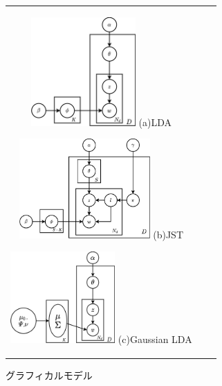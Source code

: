 \documentclass[uplatex]{jsarticle}
\begin{document}
\begin{figure}
    \begin{tabular}{ccc}
        \begin{minipage}[b]{0.33\hsize}
            \begin{center}
                \includegraphics[width=4cm]{picture/LDA.png}
                (a)LDA
            \end{center}
        \end{minipage}
        \begin{minipage}[b]{0.33\hsize}
            \begin{center}
                \includegraphics[width=5cm]{picture/JST.png}
                (b)JST
            \end{center}
        \end{minipage}
        \begin{minipage}[b]{0.33\hsize}
            \begin{center}
                \includegraphics[width=4cm]{picture/GaussianLDA.png}
                (c)Gaussian LDA
            \end{center}
        \end{minipage}
    \end{tabular}
    \caption{グラフィカルモデル}
\end{figure}
\end{document}

